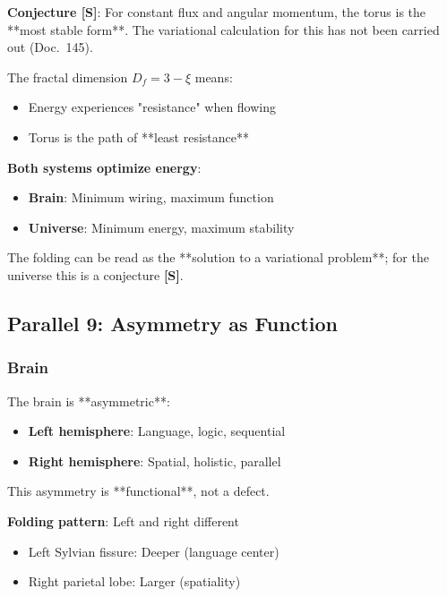 	\textbf{Conjecture \textbf{[S]}}: For constant flux and angular momentum, the torus is the **most stable form**. The variational calculation for this has not been carried out (Doc.~145).

	The fractal dimension $D_f = 3-\xi$ means:
	\begin{itemize}
		\item Energy experiences "resistance" when flowing
		\item Torus is the path of **least resistance**
	\end{itemize}

	\begin{keyresult}
		\textbf{Both systems optimize energy}:

		\begin{itemize}
			\item \textbf{Brain}: Minimum wiring, maximum function
			\item \textbf{Universe}: Minimum energy, maximum stability
		\end{itemize}

		The folding can be read as the **solution to a variational problem**; for the universe this is a conjecture \textbf{[S]}.
	\end{keyresult}

	\subsection{Parallel 9: Asymmetry as Function}

	\subsubsection{Brain}

	The brain is **asymmetric**:

	\begin{itemize}
		\item \textbf{Left hemisphere}: Language, logic, sequential
		\item \textbf{Right hemisphere}: Spatial, holistic, parallel
	\end{itemize}

	This asymmetry is **functional**, not a defect.

	\textbf{Folding pattern}: Left and right different
	\begin{itemize}
		\item Left Sylvian fissure: Deeper (language center)
		\item Right parietal lobe: Larger (spatiality)
	\end{itemize}

